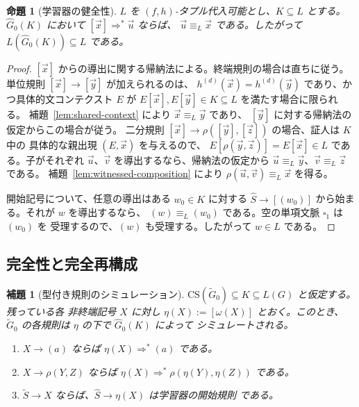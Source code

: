 \documentclass[11pt,a4paper]{ltjsarticle}
\newtheorem{lemma}[theorem]{補題}
\newtheorem{proposition}[theorem]{命題}
\theoremstyle{remark}
\newcommand{\CS}{\mathrm{CS}}
\newcommand{\tuple}[1]{\vec{#1}}
\newcommand{\blank}{\square}
\begin{document}
\begin{proposition}[学習器の健全性]
\label{prop:learner-soundness}
\(L\) を \((f,h)\)-タプル代入可能とし、\(K\subseteq L\) とする。
\(\widehat G_0(K)\) において \([\tuple x]\Rightarrow^*\tuple u\) ならば、
\(\tuple u\equiv_L\tuple x\) である。したがって
\(L(\widehat G_0(K))\subseteq L\) である。
\end{proposition}

\begin{proof}
\([\tuple x]\) からの導出に関する帰納法による。終端規則の場合は直ちに従う。
単位規則 \([\tuple x]\to[\tuple y]\) が加えられるのは、
\(h^{(d)}(\tuple x)=h^{(d)}(\tuple y)\) であり、かつ具体的文コンテクスト \(E\) が
\(E[\tuple x],E[\tuple y]\in K\subseteq L\) を満たす場合に限られる。
補題~\ref{lem:shared-context} により \(\tuple x\equiv_L\tuple y\) であり、
\([\tuple y]\) に対する帰納法の仮定からこの場合が従う。
二分規則 \([\tuple x]\to\rho([\tuple y],[\tuple z])\) の場合、証人は \(K\) 中の
具体的な親出現 \((E,\tuple x)\) を与えるので、
\(E[\rho(\tuple y,\tuple z)]=E[\tuple x]\in L\) である。子がそれぞれ
\(\tuple u\)、\(\tuple v\) を導出するなら、帰納法の仮定から
\(\tuple u\equiv_L\tuple y\)、\(\tuple v\equiv_L\tuple z\) である。
補題~\ref{lem:witnessed-composition} により
\(\rho(\tuple u,\tuple v)\equiv_L\tuple x\) を得る。

開始記号について、任意の導出はある \(w_0\in K\) に対する
\(\widehat S\to[(w_0)]\) から始まる。それが \(w\) を導出するなら、
\((w)\equiv_L(w_0)\) である。空の単項文脈 \(\blank_1\) は \((w_0)\) を
受理するので、\((w)\) も受理する。したがって \(w\in L\) である。
\end{proof}

\subsection{完全性と完全再構成}
\label{sec:completeness}

\begin{lemma}[型付き規則のシミュレーション]
\label{lem:rule-simulation}
\(\CS(\widetilde G_0)\subseteq K\subseteq L(G)\) と仮定する。残っている各
非終端記号 \(X\) に対し \(\eta(X):=[\omega(X)]\) とおく。このとき、
\(\widetilde G_0\) の各規則は \(\eta\) の下で \(\widehat G_0(K)\) によって
シミュレートされる。
\begin{enumerate}[label=(\roman*),leftmargin=*]
\item \(X\to(a)\) ならば \(\eta(X)\Rightarrow^*(a)\) である。
\item \(X\to\rho(Y,Z)\) ならば
\(\eta(X)\Rightarrow^*\rho(\eta(Y),\eta(Z))\) である。
\item \(\widetilde S\to X\) ならば、\(\widehat S\to\eta(X)\) は学習器の開始規則
である。
\end{enumerate}
\end{lemma}
\end{document}
